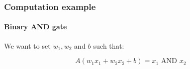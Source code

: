 \documentclass[9pt]{beamer}
\begin{document}








\begin{frame}
  \frametitle{Computation example}

  \framesubtitle{Binary AND gate}

  \begin{center}
    \scalebox{1}{
      
    }
  \end{center}

  We want to set $w_{1}, w_{2}$ and $b$ such that:

  \[
  A(w_{1}x_{1} + w_{2}x_{2} + b) = x_{1} \text{ AND } x_{2}
  \]


\end{frame}
\end{document}
